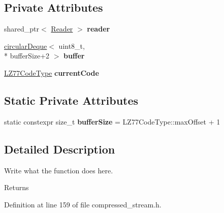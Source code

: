 \subsection*{Private Attributes}
\begin{DoxyCompactItemize}
\item 
\hypertarget{classExpandReader_abb317fa1dae74a6f01efb916dc1f1a78}{shared\+\_\+ptr$<$ \hyperlink{classReader}{Reader} $>$ {\bfseries reader}}\label{classExpandReader_abb317fa1dae74a6f01efb916dc1f1a78}

\item 
\hypertarget{classExpandReader_a75ba7c441e5d85a84432604ddbdaa734}{\hyperlink{classcircularDeque}{circular\+Deque}$<$ uint8\+\_\+t, \\*
buffer\+Size+2 $>$ {\bfseries buffer}}\label{classExpandReader_a75ba7c441e5d85a84432604ddbdaa734}

\item 
\hypertarget{classExpandReader_a3829efc17d18ef7a90c05177cea0a402}{\hyperlink{structLZ77CodeType}{L\+Z77\+Code\+Type} {\bfseries current\+Code}}\label{classExpandReader_a3829efc17d18ef7a90c05177cea0a402}

\end{DoxyCompactItemize}
\subsection*{Static Private Attributes}
\begin{DoxyCompactItemize}
\item 
\hypertarget{classExpandReader_aea9fc5ac4ca868bf23dbe48022f81d53}{static constexpr size\+\_\+t {\bfseries buffer\+Size} = L\+Z77\+Code\+Type\+::max\+Offset + 1}\label{classExpandReader_aea9fc5ac4ca868bf23dbe48022f81d53}

\end{DoxyCompactItemize}


\subsection{Detailed Description}
Write what the function does here. 

\begin{DoxyReturn}{Returns}

\end{DoxyReturn}


Definition at line 159 of file compressed\+\_\+stream.\+h.



